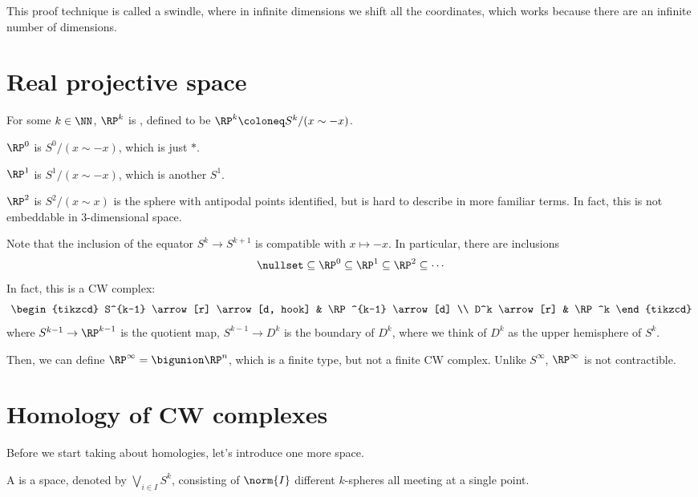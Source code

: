 \documentclass{standalone}
\begin{document}
This proof technique is called a swindle,
where in infinite dimensions we shift all the coordinates,
which works because there are an infinite number of dimensions.

\section{Real projective space}
For some \(k \in \NN\), \(\RP^k\) is ,
defined to be \(\RP^k \coloneq S^k / (x \sim -x)\).

\begin{example}
  \(\RP^0\) is \(S^0 / (x \sim -x)\), which is just \(*\).

  \(\RP^1\) is \(S^1 / (x \sim -x)\), which is another \(S^1\).

  \(\RP^2\) is \(S^2 / (x \sim x)\)
  is the sphere with antipodal points identified,
  but is hard to describe in more familiar terms.
  In fact, this is not embeddable in \(3\)-dimensional space.
\end{example}

Note that the inclusion of the equator \(S^k \to S^{k+1}\)
is compatible with \(x \mapsto -x\).
In particular, there are inclusions
\[
  \nullset \subseteq
  \RP^0 \subseteq
  \RP^1 \subseteq
  \RP^2 \subseteq \cdots
\]
In fact, this is a CW complex:
\[
  \begin{tikzcd}
    S^{k-1} \arrow[r] \arrow[d, hook] &
      \RP^{k-1} \arrow[d] \\
    D^k \arrow[r] &
      \RP^k
  \end{tikzcd}
\]
where \(S^{k-1} \to \RP^{k-1}\) is the quotient map,
\(S^{k-1} \to D^k\) is the boundary of \(D^k\),
where we think of \(D^k\) as the upper hemisphere of \(S^k\).

Then, we can define \(\RP^\infty = \bigunion \RP^n\), which is a finite type,
but not a finite CW complex.
Unlike \(S^\infty\), \(\RP^\infty\) is not contractible.


\section{Homology of CW complexes}
Before we start taking about homologies, let's introduce one more space.
\begin{definition}
  A  is a space, denoted by
  \(\bigvee_{i \in I} S^k\),
  consisting of \(\norm{I}\) different \(k\)-spheres all meeting
  at a single point.
\end{definition}
\end{document}
